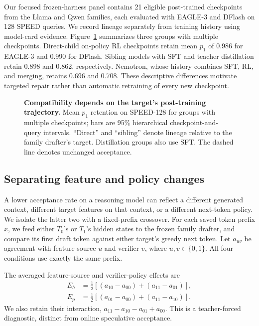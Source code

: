 \documentclass[11pt]{article}
\begin{document}
Our focused frozen-harness panel contains 21 eligible post-trained checkpoints from the Llama and Qwen families, each evaluated with EAGLE-3 and DFlash on 128 SPEED queries. We record lineage separately from training history using model-card evidence. Figure~\ref{fig:retention} summarizes three groups with multiple checkpoints. Direct-child on-policy RL checkpoints retain mean $p_1$ of 0.986 for EAGLE-3 and 0.990 for DFlash. Sibling models with SFT and teacher distillation retain 0.898 and 0.862, respectively. Nemotron, whose history combines SFT, RL, and merging, retains 0.696 and 0.708. These descriptive differences motivate targeted repair rather than automatic retraining of every new checkpoint.

\begin{figure}[t]
\centering

\caption{\textbf{Compatibility depends on the target's post-training trajectory.} Mean $p_1$ retention on SPEED-128 for groups with multiple checkpoints; bars are 95\% hierarchical checkpoint-and-query intervals. ``Direct'' and ``sibling'' denote lineage relative to the family drafter's target. Distillation groups also use SFT. The dashed line denotes unchanged acceptance.}
\label{fig:retention}
\end{figure}

\subsection{Separating feature and policy changes}
\label{sec:crossover}
A lower acceptance rate on a reasoning model can reflect a different generated context, different target features on that context, or a different next-token policy. We isolate the latter two with a fixed-prefix crossover. For each saved token prefix $x$, we feed either $T_0$'s or $T_1$'s hidden states to the frozen family drafter, and compare its first draft token against either target's greedy next token. Let $a_{uv}$ be agreement with feature source $u$ and verifier $v$, where $u,v\in\{0,1\}$. All four conditions use exactly the same prefix.

The averaged feature-source and verifier-policy effects are
\begin{align}
E_h &= \tfrac12[(a_{10}-a_{00})+(a_{11}-a_{01})],\\
E_p &= \tfrac12[(a_{01}-a_{00})+(a_{11}-a_{10})].
\end{align}
We also retain their interaction, $a_{11}-a_{10}-a_{01}+a_{00}$. This is a teacher-forced diagnostic, distinct from online speculative acceptance.
\end{document}
